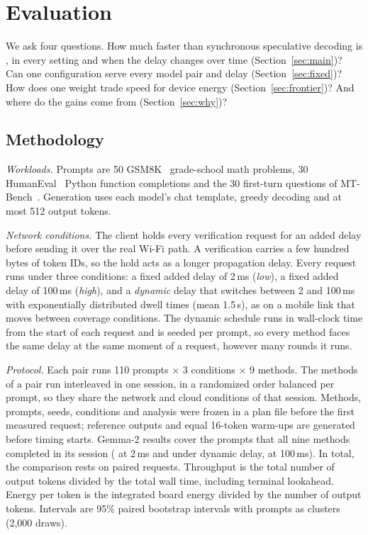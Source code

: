 \section{Evaluation}
\label{sec:eval}

We ask four questions. How much faster than synchronous speculative decoding is \cape{}, in every setting and when the delay changes over time (Section~\ref{sec:main})? Can one configuration serve every model pair and delay (Section~\ref{sec:fixed})? How does one weight trade speed for device energy (Section~\ref{sec:frontier})? And where do the gains come from (Section~\ref{sec:why})?

\subsection{Methodology}
\emph{Workloads.} Prompts are 50 GSM8K~\cite{gsm8k2021} grade-school math problems, 30 HumanEval~\cite{humaneval2021} Python function completions and the 30 first-turn questions of MT-Bench~\cite{mtbench2023}. Generation uses each model's chat template, greedy decoding and at most 512 output tokens.

\emph{Network conditions.} The client holds every verification request for an added delay before sending it over the real Wi-Fi path. A verification carries a few hundred bytes of token IDs, so the hold acts as a longer propagation delay. Every request runs under three conditions: a fixed added delay of 2\,ms (\emph{low}), a fixed added delay of 100\,ms (\emph{high}), and a \emph{dynamic} delay that switches between 2 and 100\,ms with exponentially distributed dwell times (mean 1.5\,s), as on a mobile link that moves between coverage conditions. The dynamic schedule runs in wall-clock time from the start of each request and is seeded per prompt, so every method faces the same delay at the same moment of a request, however many rounds it runs.

\emph{Protocol.} Each pair runs 110 prompts $\times$ 3 conditions $\times$ 9 methods. The methods of a pair run interleaved in one session, in a randomized order balanced per prompt, so they share the network and cloud conditions of that session. Methods, prompts, seeds, conditions and analysis were frozen in a plan file before the first measured request; reference outputs and equal 16-token warm-ups are generated before timing starts. Gemma-2 results cover the prompts that all nine methods completed in its session ( at 2\,ms and under dynamic delay,  at 100\,ms). In total, the comparison rests on  paired requests. Throughput is the total number of output tokens divided by the total wall time, including terminal lookahead. Energy per token is the integrated board energy divided by the number of output tokens. Intervals are 95\% paired bootstrap intervals with prompts as clusters (2,000 draws).

